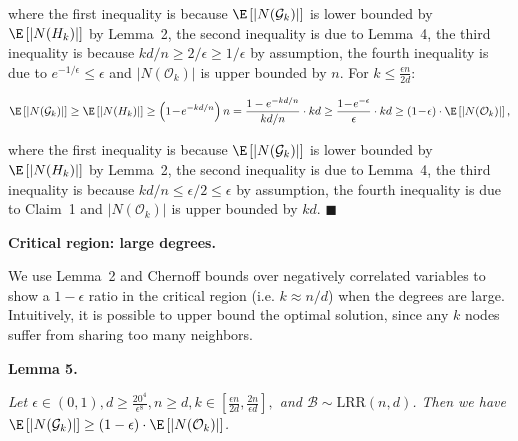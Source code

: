 \documentclass[10pt,a4paper]{article}
\begin{document}
where the first inequality is because $\E\left[|N(\mathcal{G}_{k})|\right]$ is lower bounded by $\E\left[|N(H_{k})|\right]$ by Lemma 2, the second inequality is due to Lemma 4, the third inequality is because $kd/n\geq 2/\epsilon\geq 1/\epsilon$ by assumption, the fourth inequality is due to $e^{-1/\epsilon}\leq\epsilon$ and $|N(\mathcal{O}_{k})|$ is upper bounded by $n$. For $k\leq\frac{\epsilon n}{2d}$:\par


\[\begin{gathered}
\displaystyle\E\left[|N(\mathcal{G}_{k})|\right]\geq\E\left[|N(H_{k})|\right]\geq\left(1\!-\!e^{-kd/n}\right)n=\frac{1-e^{-kd/n}}{kd/n}\cdot kd\geq\frac{1\!-\!e^{-\epsilon}}{\epsilon}\cdot kd\geq\left(1\!-\!\epsilon\right)\cdot\E\left[|N(\mathcal{O}_{k})|\right],
\end{gathered}\]


where the first inequality is because $\E\left[|N(\mathcal{G}_{k})|\right]$ is lower bounded by $\E\left[|N(H_{k})|\right]$ by Lemma 2, the second inequality is due to Lemma 4, the third inequality is because $kd/n\leq\epsilon/2\leq\epsilon$ by assumption, the fourth inequality is due to Claim 1 and $|N(\mathcal{O}_{k})|$ is upper bounded by $kd$.
\ensuremath{\blacksquare}\par






\par\medskip\noindent\textbf{Critical region: large degrees.}\par




We use Lemma 2 and Chernoff bounds over negatively correlated variables to show a $1-\epsilon$ ratio in the critical region (i.e. $k\approx n/d$) when the degrees are large.
Intuitively, it is possible to upper bound the optimal solution, since any $k$ nodes suffer from sharing too many neighbors.\par





\par\medskip\noindent\textbf{\textbf{Lemma 5}\textbf{.}}\par



\emph{Let $\epsilon\in(0,1),d\geq\frac{20^{4}}{\epsilon^{8}},n\geq d,k\in\left[\frac{\epsilon n}{2d},\frac{2n}{\epsilon d}\right],$ and $\mathcal{B}\sim\text{{LRR}}(n,d)$.
Then we have $\E\left[|N(\mathcal{G}_{k})|\right]\geq\left(1-\epsilon\right)\cdot\E\left[|N(\mathcal{O}_{k})|\right]$.}\par
\end{document}
